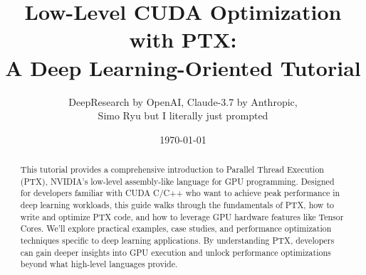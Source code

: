 \documentclass[11pt,a4paper]{article}
\title{\LARGE \textbf{Low-Level CUDA Optimization with PTX:\\A Deep Learning-Oriented Tutorial}}
\author{DeepResearch by OpenAI, Claude-3.7 by Anthropic,\\ Simo Ryu but I literally just prompted}
\date{\today}
\begin{document}
\maketitle
\thispagestyle{empty}

\begin{abstract}
This tutorial provides a comprehensive introduction to Parallel Thread Execution (PTX), NVIDIA's low-level assembly-like language for GPU programming. Designed for developers familiar with CUDA C/C++ who want to achieve peak performance in deep learning workloads, this guide walks through the fundamentals of PTX, how to write and optimize PTX code, and how to leverage GPU hardware features like Tensor Cores. We'll explore practical examples, case studies, and performance optimization techniques specific to deep learning applications. By understanding PTX, developers can gain deeper insights into GPU execution and unlock performance optimizations beyond what high-level languages provide.
\end{abstract}

\vspace{1cm}
\renewcommand{\contentsname}{\color{blue!70!black}Table of Contents}
\tableofcontents
\thispagestyle{empty}
\newpage
\end{document}

